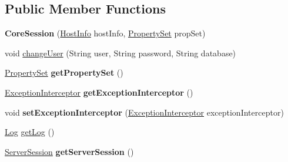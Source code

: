 \subsection*{Public Member Functions}
\begin{DoxyCompactItemize}
\item 
\mbox{\label{classcom_1_1mysql_1_1cj_1_1_core_session_a3f839aecfd1bdcd957ddf4a6a653e7ba}} 
{\bfseries Core\+Session} (\mbox{\hyperlink{classcom_1_1mysql_1_1cj_1_1conf_1_1_host_info}{Host\+Info}} host\+Info, \mbox{\hyperlink{interfacecom_1_1mysql_1_1cj_1_1conf_1_1_property_set}{Property\+Set}} prop\+Set)
\item 
void \mbox{\hyperlink{classcom_1_1mysql_1_1cj_1_1_core_session_afd7da447c9a92c0a51ba81a6ac82e89f}{change\+User}} (String user, String password, String database)
\item 
\mbox{\label{classcom_1_1mysql_1_1cj_1_1_core_session_a1b6c6041a2c657d34bb369939f6b49d2}} 
\mbox{\hyperlink{interfacecom_1_1mysql_1_1cj_1_1conf_1_1_property_set}{Property\+Set}} {\bfseries get\+Property\+Set} ()
\item 
\mbox{\label{classcom_1_1mysql_1_1cj_1_1_core_session_a8718a19455dcfc23e1f3e36d3278d7bd}} 
\mbox{\hyperlink{interfacecom_1_1mysql_1_1cj_1_1exceptions_1_1_exception_interceptor}{Exception\+Interceptor}} {\bfseries get\+Exception\+Interceptor} ()
\item 
\mbox{\label{classcom_1_1mysql_1_1cj_1_1_core_session_ab034a178b27542d0d67bbb95283d3f03}} 
void {\bfseries set\+Exception\+Interceptor} (\mbox{\hyperlink{interfacecom_1_1mysql_1_1cj_1_1exceptions_1_1_exception_interceptor}{Exception\+Interceptor}} exception\+Interceptor)
\item 
\mbox{\hyperlink{interfacecom_1_1mysql_1_1cj_1_1log_1_1_log}{Log}} \mbox{\hyperlink{classcom_1_1mysql_1_1cj_1_1_core_session_ae6ee08b5d613e57d0f9e16f037ecb6cf}{get\+Log}} ()
\item 
\mbox{\label{classcom_1_1mysql_1_1cj_1_1_core_session_aebba972c5e1c2f61230c8be4b2819230}} 
\mbox{\hyperlink{interfacecom_1_1mysql_1_1cj_1_1protocol_1_1_server_session}{Server\+Session}} {\bfseries get\+Server\+Session} ()

\end{DoxyCompactItemize}
